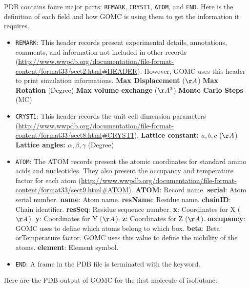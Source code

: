  
PDB contains foure major parts; \texttt{REMARK}, \texttt{CRYST1}, \texttt{ATOM}, and \texttt{END}. Here is the definition of each field and how GOMC is using them to get the information it requires.
\begin{itemize}
\item \texttt{REMARK}: This header records present experimental details, annotations, comments, and information not included in other records (\url{http://www.wwpdb.org/documentation/file-format-content/format33/sect2.html#HEADER}). However, GOMC uses this header to print simulation informations.
	\subitem \textbf{Max Displacement} ($\AA$)
	\subitem \textbf{Max Rotation} (Degree)
	\subitem \textbf{Max volume exchange} ($\AA^3$)
	\subitem \textbf{Monte Carlo Steps} (MC)
\item \texttt{CRYST1}: This header records the unit cell dimension parameters (\url{http://www.wwpdb.org/documentation/file-format-content/format33/sect8.html#CRYST1}).
	\subitem \textbf{Lattice constant: $a, b, c$} ($\AA$)
	\subitem \textbf{Lattice angles: $\alpha , \beta,  \gamma$} (Degree)
\item \texttt{ATOM}: The ATOM records present the atomic coordinates for standard amino acids and nucleotides. They also present the occupancy and temperature factor for each atom (\url{http://www.wwpdb.org/documentation/file-format-content/format33/sect9.html#ATOM}).
	\subitem \textbf{ATOM}: Record name.
	\subitem \textbf{serial}: Atom serial number.
	\subitem \textbf{name}: Atom name.
	\subitem \textbf{resName}: Residue name.
	\subitem \textbf{chainID}: Chain identifier.
	\subitem \textbf{resSeq}: Residue sequence number.
	\subitem \textbf{x}: Coordinates for X ($\AA$).
	\subitem \textbf{y}: Coordinates for Y ($\AA$).
	\subitem \textbf{z}: Coordinates for Z ($\AA$).
	\subitem \textbf{occupancy}: GOMC uses to define which atoms belong to which box.
	\subitem \textbf{beta}: Beta orTemperature factor. GOMC uses this value to define the mobility of the atoms.
	\subitem \textbf{element}: Element symbol.
	\item \texttt{END}: A frame in the PDB file is terminated with the keyword.
\end{itemize} 



Here are the PDB output of GOMC for the first molecule of isobutane:\\

